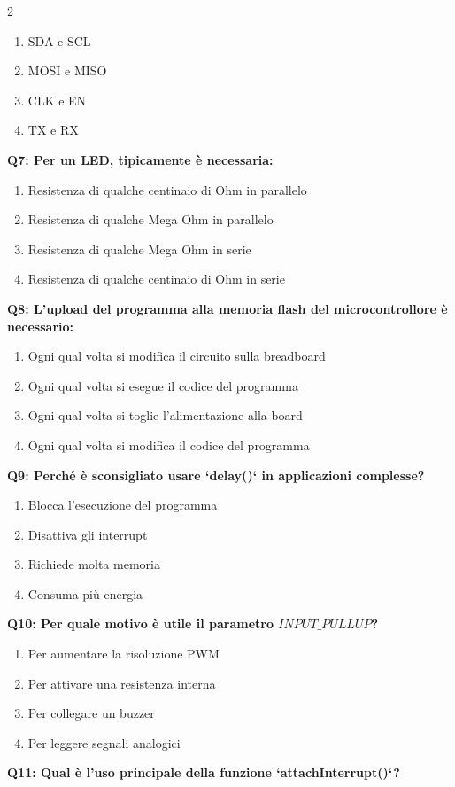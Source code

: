 \documentclass[10pt]{article}
\begin{document}
\begin{multicols}{2}
\begin{enumerate}[label=\arabic*.]
\item SDA e SCL
\item MOSI e MISO
\item CLK e EN
\item TX e RX
\end{enumerate}
\textbf{Q7: Per un LED, tipicamente è necessaria:}

\begin{enumerate}[label=\arabic*.]
\item Resistenza di qualche centinaio di Ohm in parallelo
\item Resistenza di qualche Mega Ohm in parallelo
\item Resistenza di qualche Mega Ohm in serie
\item Resistenza di qualche centinaio di Ohm in serie
\end{enumerate}
\textbf{Q8: L'upload del programma alla memoria flash del microcontrollore è necessario:}

\begin{enumerate}[label=\arabic*.]
\item Ogni qual volta si modifica il circuito sulla breadboard
\item Ogni qual volta si esegue il codice del programma
\item Ogni qual volta si toglie l'alimentazione alla board
\item Ogni qual volta si modifica il codice del programma
\end{enumerate}
\textbf{Q9: Perché è sconsigliato usare `delay()` in applicazioni complesse?}

\begin{enumerate}[label=\arabic*.]
\item Blocca l’esecuzione del programma
\item Disattiva gli interrupt
\item Richiede molta memoria
\item Consuma più energia
\end{enumerate}
\textbf{Q10: Per quale motivo è utile il parametro $INPUT\_PULLUP$?}

\begin{enumerate}[label=\arabic*.]
\item Per aumentare la risoluzione PWM
\item Per attivare una resistenza interna
\item Per collegare un buzzer
\item Per leggere segnali analogici
\end{enumerate}
\textbf{Q11: Qual è l’uso principale della funzione `attachInterrupt()`?}


\end{multicols}
\end{document}
